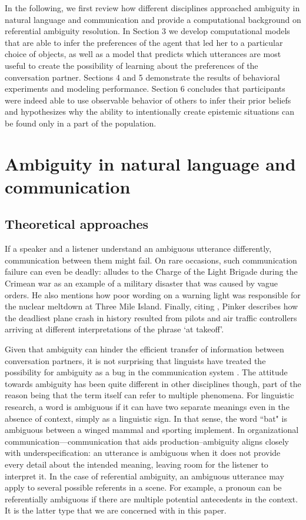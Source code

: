 \documentclass[10pt,a4paper]{article}
\begin{document}
In the following, we first review how different disciplines approached ambiguity in natural language and communication and provide a computational background on referential ambiguity resolution. 
In Section 3 we develop computational models that are able to infer the preferences of the agent that led her to a particular choice of objects, as well as a model that predicts which utterances are most useful to create the possibility of learning about the preferences of the conversation partner. 
Sections 4 and 5 demonstrate the results of behavioral experiments and modeling performance. 
Section 6 concludes that participants were indeed able to use observable behavior of others to infer their prior beliefs and hypothesizes why the ability to intentionally create epistemic situations can be found only in a part of the population.


\section{Ambiguity in natural language and communication}
\subsection{Theoretical approaches}

If a speaker and a listener understand an ambiguous utterance differently, communication between them might fail.
On rare occasions, such communication failure can even be deadly: 
 alludes to the Charge of the Light Brigade during the Crimean war as an example of a military disaster that was caused by vague orders.
He also mentions how poor wording on a warning light was responsible for the nuclear meltdown at Three Mile Island. Finally, citing , Pinker describes how the deadliest plane crash in history resulted from pilots and air traffic controllers arriving at different interpretations of the phrase `at takeoff'.

Given that ambiguity can hinder the efficient transfer of information between conversation partners, it is not surprising that linguists have treated the possibility for ambiguity as a bug in the communication system \cite{grice1975,chomsky2002minimalism}. The attitude towards ambiguity has been quite different in other disciplines though, part of the reason being that the term itself can refer to multiple phenomena. For linguistic research, a word is ambiguous if it can have two separate meanings even in the absence of context, simply as a linguistic sign. In that sense, the word ``bat" is ambiguous between a winged mammal and sporting implement. In organizational communication---communication that aids production--ambiguity aligns closely with underspecification: an utterance is ambiguous when it does not provide every detail about the intended meaning, leaving room for the listener to interpret it. In the case of referential ambiguity, an ambiguous utterance may apply to several possible referents in a scene. For example, a pronoun can be referentially ambiguous if there are multiple potential antecedents in the context. It is the latter type that we are concerned with in this paper.
\end{document}
